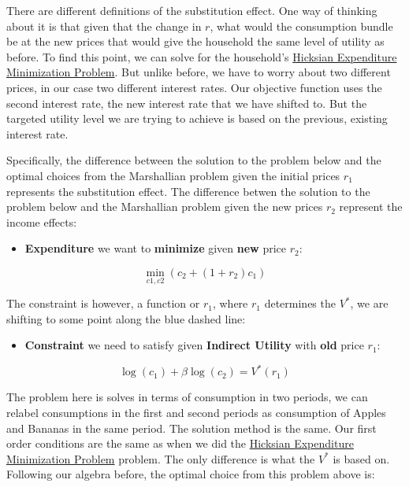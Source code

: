 \documentclass[
]{book}
\providecommand{\tightlist}{%
  \setlength{\itemsep}{0pt}\setlength{\parskip}{0pt}}
\begin{document}
There are different definitions of the substitution effect. One way of
thinking about it is that given that the change in \(r\), what would the
consumption bundle be at the new prices that would give the household
the same level of utility as before. To find this point, we can solve
for the household's \href{https://math4econ.github.io/opti_hh_constrained_brsv/household_c1_c2_constrained_expmin.html}{Hicksian Expenditure Minimization
Problem}.
But unlike before, we have to worry about two different prices, in our
case two different interest rates. Our objective function uses the
second interest rate, the new interest rate that we have shifted to. But
the targeted utility level we are trying to achieve is based on the
previous, existing interest rate.

Specifically, the difference between the solution to the problem below
and the optimal choices from the Marshallian problem given the initial
prices \(r_1\) represents the substitution effect. The difference betwen
the solution to the problem below and the Marshallian problem given the
new prices \(r_2\) represent the income effects:

\begin{itemize}
\tightlist
\item
  \textbf{Expenditure} we want to \textbf{minimize} given \textbf{new} price \(r_2\):
\end{itemize}

\[\min_{c1,c2} \left(c_2 +(1+r_2 )c_1 \right)\]

The constraint is however, a function or \(r_1\), where \(r_1\) determines
the \(V^*\), we are shifting to some point along the blue dashed line:

\begin{itemize}
\tightlist
\item
  \textbf{Constraint} we need to satisfy given \textbf{Indirect Utility} with
  \textbf{old} price \(r_1\):
\end{itemize}

\[\log (c_1 )+\beta \log (c_2 )=V^* (r_1 )\]

The problem here is solves in terms of consumption in two periods, we
can relabel consumptions in the first and second periods as consumption
of Apples and Bananas in the same period. The solution method is the
same. Our first order conditions are the same as when we did the
\href{https://math4econ.github.io/opti_hh_constrained_brsv/household_c1_c2_constrained_expmin.html}{Hicksian Expenditure Minimization
Problem}
problem. The only difference is what the \(V^{\ast }\) is based on.
Following our algebra before, the optimal choice from this problem above
is:
\end{document}
